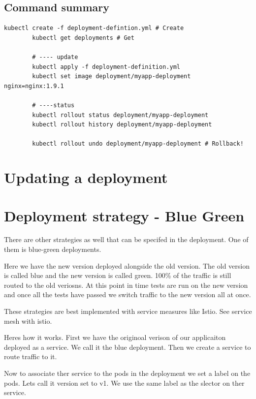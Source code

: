 \documentclass[11pt]{book}
\begin{document}
    \subsection{Command summary}
    \begin{lstlisting}[language=terminal, caption={Sumnmary of commands}]
        kubectl create -f deployment-defintion.yml # Create
        kubectl get deployments # Get

        # ---- update
        kubectl apply -f deployment-definition.yml
        kubectl set image deployment/myapp-deployment nginx=nginx:1.9.1

        # ----status
        kubectl rollout status deployment/myapp-deployment
        kubectl rollout history deployment/myapp-deployment

        kubectl rollout undo deployment/myapp-deployment # Rollback!

    \end{lstlisting}


    \section{Updating a deployment}

    \section{Deployment strategy - Blue Green}
    There are other strategies as well that can be specifed in the deployment.
    One of them is blue-green deployments.

    Here we have the new version deployed alongside the old version.
    The old version is called blue and the new version is called green.
    100\% of the traffic is still routed to the old veriosns.
    At this point in time tests are run on the new version and once all the tests have passed we switch traffic to the new version all at once.

    These strategies are best implemented with service measures like Istio.
    See service mesh with istio.

    Heres how it works.
    First we have the originoal verison of our applicaiton deployed as a service.
    We call it the blue deployment.
    Then we create a service to route traffic to it.

    Now to associate ther service to the pods in the deployment we set a label on the pods. Lets call it version set to v1.
    We use the same label as the slector on ther service.
\end{document}
